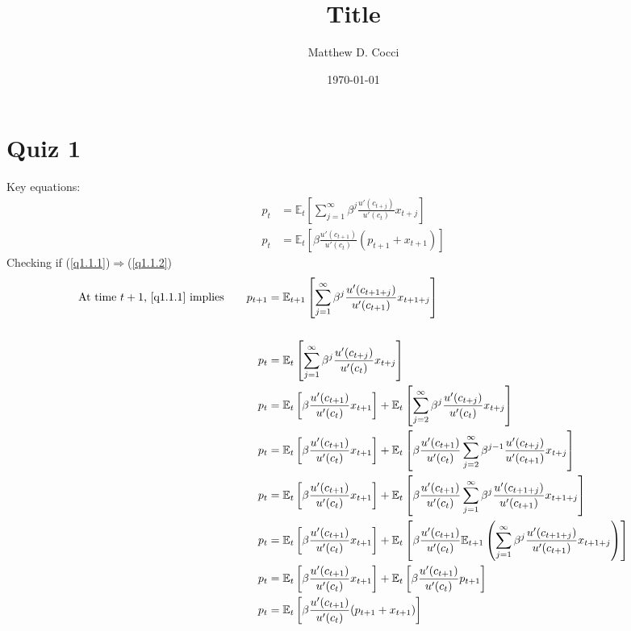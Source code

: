\documentclass[12pt]{article}
\author{Matthew D. Cocci}
\title{Title}
\date{\today}
\theoremstyle{plain}
\theoremstyle{definition}
\theoremstyle{remark}
\begin{document}


\section{Quiz 1}

Key equations:
\begin{align}
  p_t &= \mathbb{E}_t\left[
    \sum^\infty_{j=1} \beta^j \frac{u'(c_{t+j})}{u'(c_t)} x_{t+j}
  \right]\label{q1.1.1}\\
  p_t &= \mathbb{E}_t\left[
    \beta \frac{u'(c_{t+1})}{u'(c_t)} (p_{t+1}+x_{t+1})
  \right]\label{q1.1.2}
\end{align}
Checking if (\ref{q1.1.1})$\Rightarrow$(\ref{q1.1.2})
\begin{align*}
  \text{At time $t+1$,~\ref{q1.1.1} implies}\qquad
  p_{t+1} &= \mathbb{E}_{t+1}\left[
    \sum^\infty_{j=1} \beta^j \frac{u'(c_{t+1+j})}{u'(c_{t+1})} x_{t+1+j}
  \right]\\\\
  p_t &= \mathbb{E}_t\left[
    \sum^\infty_{j=1} \beta^j \frac{u'(c_{t+j})}{u'(c_t)} x_{t+j}
  \right]\\
  p_t &= \mathbb{E}_t\left[
    \beta \frac{u'(c_{t+1})}{u'(c_t)} x_{t+1}
    \right]
    +
    \mathbb{E}_t\left[
    \sum^\infty_{j=2} \beta^j \frac{u'(c_{t+j})}{u'(c_t)} x_{t+j}
  \right]\\
  p_t &= \mathbb{E}_t\left[
    \beta \frac{u'(c_{t+1})}{u'(c_t)} x_{t+1}
    \right]
    +
    \mathbb{E}_t\left[
      \beta\frac{u'(c_{t+1})}{u'(c_t)}
      \sum^\infty_{j=2} \beta^{j-1} \frac{u'(c_{t+j})}{u'(c_{t+1})} x_{t+j}
  \right]\\
  p_t &= \mathbb{E}_t\left[
    \beta \frac{u'(c_{t+1})}{u'(c_t)} x_{t+1}
    \right]
    +
    \mathbb{E}_t\left[
      \beta\frac{u'(c_{t+1})}{u'(c_t)}
      \sum^\infty_{j=1} \beta^{j} \frac{u'(c_{t+1+j})}{u'(c_{t+1})} x_{t+1+j}
  \right]\\
  p_t &= \mathbb{E}_t\left[
    \beta \frac{u'(c_{t+1})}{u'(c_t)} x_{t+1}
    \right]
    +
    \mathbb{E}_t\left[
      \beta\frac{u'(c_{t+1})}{u'(c_t)}
      \mathbb{E}_{t+1}
      \left(
      \sum^\infty_{j=1} \beta^{j}
      \frac{u'(c_{t+1+j})}{u'(c_{t+1})} x_{t+1+j}
      \right)
  \right]\\
  p_t &= \mathbb{E}_t\left[
    \beta \frac{u'(c_{t+1})}{u'(c_t)} x_{t+1}
    \right]
    +
    \mathbb{E}_t\left[
      \beta\frac{u'(c_{t+1})}{u'(c_t)}
      p_{t+1}
  \right]\\
  p_t &= \mathbb{E}_t\left[
    \beta \frac{u'(c_{t+1})}{u'(c_t)} (p_{t+1}+x_{t+1})
    \right]
\end{align*}
\end{document}
